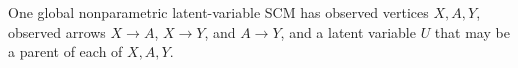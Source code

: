 One global nonparametric latent-variable SCM has observed vertices \(X,A,Y\), observed arrows \(X\to A\), \(X\to Y\), and \(A\to Y\), and a latent variable \(U\) that may be a parent of each of \(X,A,Y\).